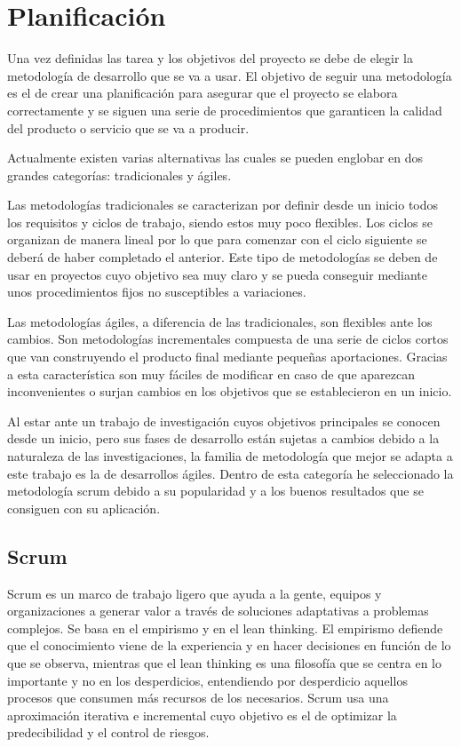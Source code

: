 \chapter{Planificación}
Una vez definidas las tarea y los objetivos del proyecto se debe de elegir la metodología de desarrollo que se va a usar. El objetivo de seguir una metodología es el de crear una planificación para asegurar que el proyecto se elabora correctamente y se siguen una serie de procedimientos que garanticen la calidad del producto o servicio que se va a producir. 

Actualmente existen varias alternativas las cuales se pueden englobar en dos grandes categorías: tradicionales y ágiles. 

Las metodologías tradicionales se caracterizan por definir desde un inicio todos los requisitos y ciclos de trabajo, siendo estos muy poco flexibles. Los ciclos se organizan de manera lineal por lo que para comenzar con el ciclo siguiente se deberá de haber completado el anterior. Este tipo de metodologías se deben de usar en proyectos cuyo objetivo sea muy claro y se pueda conseguir mediante unos procedimientos fijos no susceptibles a variaciones.

Las metodologías ágiles, a diferencia de las tradicionales, son flexibles ante los cambios. Son metodologías incrementales compuesta de una serie de ciclos cortos que van construyendo el producto final mediante pequeñas aportaciones. Gracias a esta característica son muy fáciles de modificar en caso de que aparezcan inconvenientes o surjan cambios en los objetivos que se establecieron en un inicio.  

Al estar ante un trabajo de investigación cuyos objetivos principales se conocen desde un inicio, pero sus fases de desarrollo están sujetas a cambios debido a la naturaleza de las investigaciones, la familia de metodología que mejor se adapta a este trabajo es la de desarrollos ágiles. Dentro de esta categoría he seleccionado la metodología scrum debido a su popularidad y a los buenos resultados que se consiguen con su aplicación.
\section{Scrum}
Scrum es un marco de trabajo ligero que ayuda a la gente, equipos y organizaciones a generar valor a través de soluciones adaptativas a problemas complejos. Se basa en el empirismo y en el lean thinking. El empirismo defiende que el conocimiento viene de la experiencia y en hacer decisiones en función de lo que se observa, mientras que el lean thinking es una filosofía que se centra en lo importante y no en los desperdicios, entendiendo por desperdicio aquellos procesos que consumen más recursos de los necesarios. Scrum usa una aproximación iterativa e incremental cuyo objetivo es el de optimizar la predecibilidad y el control de riesgos. 

